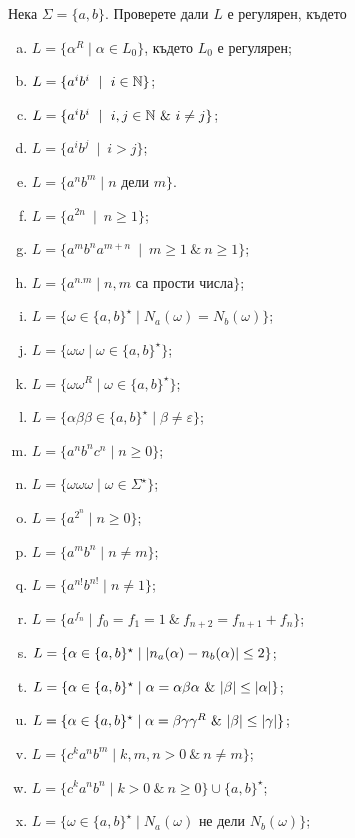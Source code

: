 \begin{problem}
  Нека $\Sigma = \{a,b\}$.  Проверете дали $L$ е регулярен, където
  \begin{enumerate}[a)]
  \item
    $L = \{\alpha^R \mid \alpha \in L_0\}$, където $L_0$ е регулярен;
  \item
    $L = \{a^ib^i\ \mid\ i\in\Nat\}$;
  \item
    $L = \{a^ib^i\ \mid\ i,j\in\Nat\ \&\ i\neq j\}$;
  \item
    $L = \{a^ib^j\ \mid\ i > j\}$;
  \item
    $L = \{a^nb^m \mid n\mbox{ дели }m\}$.
  \item
    $L = \{a^{2n}\ \mid\ n\geq 1\}$;
  \item
    $L = \{a^mb^na^{m+n}\ \mid\ m\geq 1\ \&\ n\geq 1\}$;
  \item
    $L = \{a^{n.m}\mid n,m\mbox{ са прости числа}\}$;
  \item
    $L = \{\omega\in\{a,b\}^\star \mid N_a(\omega) = N_b(\omega)\}$;
  \item
    $L = \{\omega\omega\mid \omega\in\{a,b\}^\star\}$;
  \item
    $L = \{\omega\omega^R\mid \omega\in\{a,b\}^\star\}$;
  \item
    $L = \{\alpha\beta\beta \in \{a,b\}^\star\mid \beta \neq \varepsilon\}$;
  \item
    $L = \{a^nb^nc^n\mid n\geq 0\}$;
  \item
    $L = \{\omega\omega\omega\mid \omega\in \Sigma^\star\}$;
  \item
    $L = \{a^{2^n}\mid n\geq 0\}$;
  \item
    $L = \{a^mb^n\mid n\neq m\}$;
  \item
    $L = \{a^{n!}b^{n!}\mid n\neq 1\}$;
  \item
    $L = \{a^{f_n} \mid f_0 = f_1 = 1\ \&\ f_{n+2} = f_{n+1} + f_{n}\}$;
  \item
    $L = \{\alpha \in \{a,b\}^\star \mid \lvert{n_a(\alpha) - n_b(\alpha)}\rvert \leq 2\}$;
  \item
    $L = \{\alpha \in \{a,b\}^\star \mid \alpha = \alpha\beta\alpha\ \&\ \lvert{\beta}\rvert \leq \lvert{\alpha}\rvert\}$;
  \item
    $L = \{\alpha \in \{a,b\}^\star \mid \alpha = \beta\gamma\gamma^R\ \&\ \lvert{\beta}\rvert \leq \lvert{\gamma}\rvert\}$;
  \item
    $L = \{c^ka^nb^m \mid k,m,n > 0\ \&\ n \neq m\}$;
  \item
    $L = \{c^ka^nb^n \mid k > 0\ \&\ n \geq 0\}\cup\{a,b\}^\star$;
  \item
    $L = \{\omega \in \{a,b\}^\star \mid N_a(\omega)\text{ не дели }N_b(\omega)\}$;
  \end{enumerate}
\end{problem}

